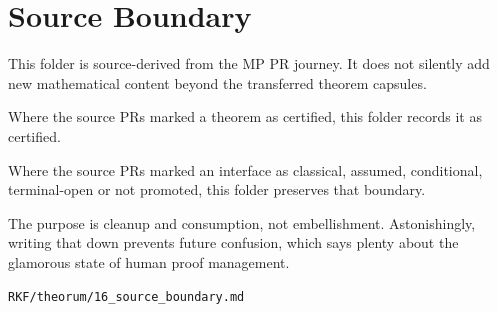 \hypertarget{source-boundary}{%
\chapter{Source Boundary}\label{source-boundary}}

This folder is source-derived from the MP PR journey. It does not silently add new mathematical content beyond the transferred theorem capsules.

Where the source PRs marked a theorem as certified, this folder records it as certified.

Where the source PRs marked an interface as classical, assumed, conditional, terminal-open or not promoted, this folder preserves that boundary.

The purpose is cleanup and consumption, not embellishment. Astonishingly, writing that down prevents future confusion, which says plenty about the glamorous state of human proof management.

\begin{flushright}\small\texttt{RKF/theorum/16\_source\_boundary.md}\end{flushright}

